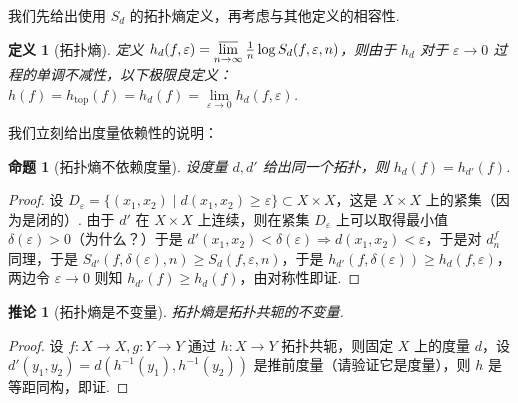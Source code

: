 \documentclass[11pt, a4paper, oneside]{ctexart}
\newtheorem{corollary}[theorem]{推论}
\newtheorem{definition}[theorem]{定义}
\newtheorem{proposition}[theorem]{命题}
\renewcommand{\top}{\mathrm{top}}
\begin{document}
    我们先给出使用 $S_d$ 的拓扑熵定义，再考虑与其他定义的相容性.
    \begin{definition}[拓扑熵]
        定义 $h_d(f,\varepsilon)=\varlimsup\limits_{n\to\infty}\frac{1}{n}\log S_d(f,\varepsilon,n)$，则由于 $h_d$ 对于 $\varepsilon\to 0$ 过程的单调不减性，以下极限良定义：$h(f)=h_{\top}(f)=h_d(f)=\lim\limits_{\varepsilon\to 0}h_d(f,\varepsilon)$.
    \end{definition}
    我们立刻给出度量依赖性的说明：
    \begin{proposition}[拓扑熵不依赖度量]
        设度量 $d,d'$ 给出同一个拓扑，则 $h_d(f)=h_{d'}(f)$.
    \end{proposition}
    \begin{proof}
        设 $D_{\varepsilon}=\{(x_1,x_2)\mid d(x_1,x_2)\geq \varepsilon\}\subset X\times X$，这是 $X\times X$ 上的紧集（因为是闭的）. 由于 $d'$ 在 $X\times X$ 上连续，则在紧集 $D_{\varepsilon}$ 上可以取得最小值 $\delta(\varepsilon)>0$（为什么？）于是 $d'(x_1,x_2)<\delta(\varepsilon)\Rightarrow d(x_1,x_2)<\varepsilon$，于是对 $d_n^f$ 同理，于是 $S_{d'}(f,\delta(\varepsilon),n)\geq S_d(f,\varepsilon,n)$，于是 $h_{d'}(f,\delta(\varepsilon))\geq h_d(f,\varepsilon)$，两边令 $\varepsilon\to 0$ 则知 $h_{d'}(f)\geq h_d(f)$，由对称性即证.
    \end{proof}
    \begin{corollary}[拓扑熵是不变量]
        拓扑熵是拓扑共轭的不变量.
    \end{corollary}
    \begin{proof}
        设 $f:X\to X,g:Y\to Y$ 通过 $h:X\to Y$ 拓扑共轭，则固定 $X$ 上的度量 $d$，设 $d'(y_1,y_2)=d(h^{-1}(y_1),h^{-1}(y_2))$ 是推前度量（请验证它是度量），则 $h$ 是等距同构，即证.
    \end{proof}
\end{document}
